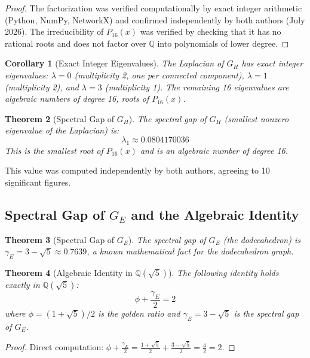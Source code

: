 \documentclass[11pt,a4paper]{article}
\theoremstyle{plain}
\newtheorem{theorem}{Theorem}[section]
\newtheorem{corollary}[theorem]{Corollary}
\theoremstyle{definition}
\theoremstyle{remark}
\begin{document}
\begin{proof}
The factorization was verified computationally by exact integer arithmetic (Python, NumPy, NetworkX) and confirmed independently by both authors (July 2026). The irreducibility of $P_{16}(x)$ was verified by checking that it has no rational roots and does not factor over $\mathbb{Q}$ into polynomials of lower degree.
\end{proof}

\begin{corollary}[Exact Integer Eigenvalues]
\label{cor:integer_eigenvalues}
The Laplacian of $G_H$ has exact integer eigenvalues: $\lambda = 0$ (multiplicity 2, one per connected component), $\lambda = 1$ (multiplicity 2), and $\lambda = 3$ (multiplicity 1). The remaining 16 eigenvalues are algebraic numbers of degree 16, roots of $P_{16}(x)$.
\end{corollary}

\begin{theorem}[Spectral Gap of $G_H$]
\label{thm:spectral_gap_GH}
The spectral gap of $G_H$ (smallest nonzero eigenvalue of the Laplacian) is:
\[
\lambda_1 \approx 0.0804170036
\]
This is the smallest root of $P_{16}(x)$ and is an algebraic number of degree 16.
\end{theorem}

This value was computed independently by both authors, agreeing to 10 significant figures.

\subsection{Spectral Gap of \texorpdfstring{$G_E$}{GE} and the Algebraic Identity}
\label{sec:spectral_GE}

\begin{theorem}[Spectral Gap of $G_E$]
\label{thm:spectral_gap_GE}
The spectral gap of $G_E$ (the dodecahedron) is $\gamma_E = 3 - \sqrt{5} \approx 0.7639$, a known mathematical fact for the dodecahedron graph.
\end{theorem}

\begin{theorem}[Algebraic Identity in $\mathbb{Q}(\sqrt{5})$]
\label{thm:algebraic_identity}
The following identity holds exactly in $\mathbb{Q}(\sqrt{5})$:
\[
\phi + \frac{\gamma_E}{2} = 2
\]
where $\phi = (1 + \sqrt{5})/2$ is the golden ratio and $\gamma_E = 3 - \sqrt{5}$ is the spectral gap of $G_E$.
\end{theorem}

\begin{proof}
Direct computation: $\displaystyle\phi + \frac{\gamma_E}{2} = \frac{1 + \sqrt{5}}{2} + \frac{3 - \sqrt{5}}{2} = \frac{4}{2} = 2$.
\end{proof}
\end{document}
